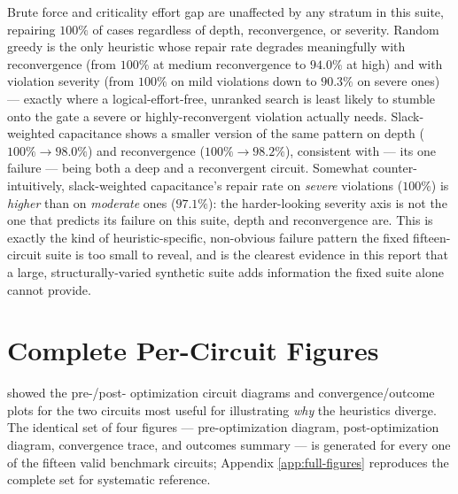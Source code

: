 Brute force and criticality effort gap are unaffected by any stratum in
this suite, repairing $100\%$ of cases regardless of depth, reconvergence,
or severity. Random greedy is the only heuristic whose repair rate degrades
meaningfully with reconvergence (from $100\%$ at medium reconvergence to
$94.0\%$ at high) and with violation severity (from $100\%$ on mild
violations down to $90.3\%$ on severe ones) --- exactly where a
logical-effort-free, unranked search is least likely to stumble onto the
gate a severe or highly-reconvergent violation actually needs. Slack-weighted
capacitance shows a smaller version of the same pattern on depth
($100\%\rightarrow98.0\%$) and reconvergence ($100\%\rightarrow98.2\%$),
consistent with  --- its one failure --- being both a
deep and a reconvergent circuit. Somewhat counter-intuitively,
slack-weighted capacitance's repair rate on \emph{severe} violations
($100\%$) is \emph{higher} than on \emph{moderate} ones ($97.1\%$): the
harder-looking severity axis is not the one that predicts its failure on
this suite, depth and reconvergence are. This is exactly the kind of
heuristic-specific, non-obvious failure pattern the fixed fifteen-circuit
suite is too small to reveal, and is the clearest evidence in this report
that a large, structurally-varied synthetic suite adds information the
fixed suite alone cannot provide.


\section{Complete Per-Circuit Figures}
\label{sec:res-full-figures}

 showed the pre-/post-
optimization circuit diagrams and convergence/outcome plots for the two
circuits most useful for illustrating \emph{why} the heuristics diverge.
The identical set of four figures --- pre-optimization diagram,
post-optimization diagram, convergence trace, and outcomes summary --- is
generated for every one of the fifteen valid benchmark circuits;
Appendix \ref{app:full-figures} reproduces the complete set for systematic
reference.
